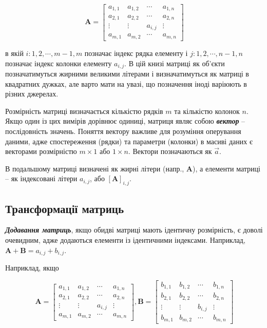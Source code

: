 \documentclass[
  11pt,
]{book}
\begin{document}
\[\textbf{A} = \begin{bmatrix}
a_{1, 1} & a_{1,2} & \cdots & a_{1, n}\\
a_{2, 1} & a_{2,2} & \cdots & a_{2, n}\\
\vdots & \vdots & a_{i,j} & \vdots \\
a_{m, 1} & a_{m,2} & \cdots & a_{m, n}
\end{bmatrix}\]

в якій \(i: 1, 2, \cdots, m-1, m\) позначає індекс рядка елементу і \(j: 1, 2, \cdots, n-1, n\) позначає індекс колонки елементу \(a_{i, j}\). В цій книзі матриці як об'єкти позначатимуться жирними великими літерами і визначатимуться як матриці в квадратних дужках, але варто мати на увазі, що позначення іноді варіюють в різних джерелах.

Розмірність матриці визначається кількістю рядків \(m\) та кількістю колонок \(n\). Якщо один із цих вимірів дорівнює одиниці, матриця являє собою \textbf{\emph{вектор}} -- послідовність значень. Поняття вектору важливе для розуміння оперування даними, адже спостереження (рядки) та параметри (колонки) в масиві даних є векторами розмірністю \(m \times 1\) або \(1 \times n\). Вектори позначаються як \(\vec{a}\).

В подальшому матриці визначені як жирні літери (напр., \(\mathbf{A}\)), а елементи матриці -- як індексовані літери \(a_{i,j}\), або \([\mathbf{A}]_{i,j}\).

\subsection{Трансформації матриць}\label{ux442ux440ux430ux43dux441ux444ux43eux440ux43cux430ux446ux456ux457-ux43cux430ux442ux440ux438ux446ux44c}

\textbf{\emph{Додавання матриць}}, якщо обидві матриці мають ідентичну розмірність, є доволі очевидним, адже додаються елементи із ідентичними індексами. Наприклад, \(\mathbf{A}+\mathbf{B} = a_{i,j}+b_{i, j}\).

Наприклад, якщо

\[\mathbf{A} = \begin{bmatrix}
a_{1, 1} & a_{1,2} & \cdots & a_{1, n}\\
a_{2, 1} & a_{2,2} & \cdots & a_{2, n}\\
\vdots & \vdots & a_{i,j} & \vdots \\
a_{m, 1} & a_{m,2} & \cdots & a_{m, n}
\end{bmatrix},
\mathbf{B} = \begin{bmatrix}
b_{1, 1} & b_{1,2} & \cdots & b_{1, n}\\
b_{2, 1} & b_{2,2} & \cdots & b_{2, n}\\
\vdots & \vdots & b_{i,j} & \vdots \\
b_{m, 1} & b_{m,2} & \cdots & b_{m, n}
\end{bmatrix}\]
\end{document}
